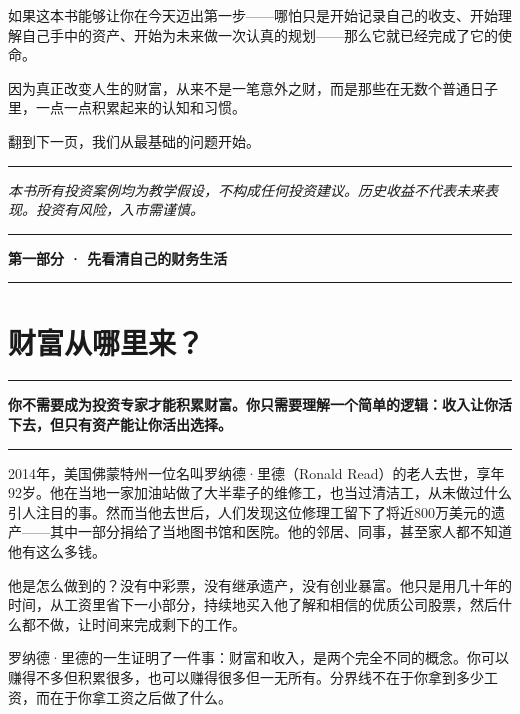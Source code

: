 \documentclass[a4paper,11pt,oneside,fontset=none,UTF8,zihao=-4]{ctexbook}
\newcommand{\partdivider}[1]{%
  \clearpage
  \thispagestyle{empty}%
  \vspace*{5.0cm}%
  \begin{center}%
    {\color{dh-blossom}\rule{0.35\textwidth}{1.5pt}\par}%
    \vspace{1.2cm}%
    {\Huge\bfseries\sffamily\color{dh-navy} #1\par}%
    \vspace{1.2cm}%
    {\color{dh-blossom}\rule{0.35\textwidth}{1.5pt}\par}%
  \end{center}%
  \vfill
  \clearpage
}
\begin{document}
如果这本书能够让你在今天迈出第一步------哪怕只是开始记录自己的收支、开始理解自己手中的资产、开始为未来做一次认真的规划------那么它就已经完成了它的使命。

因为真正改变人生的财富，从来不是一笔意外之财，而是那些在无数个普通日子里，一点一点积累起来的认知和习惯。

翻到下一页，我们从最基础的问题开始。

\begin{center}{\color{dh-bronze}\rule{0.2\textwidth}{0.5pt}}\end{center}

\emph{本书所有投资案例均为教学假设，不构成任何投资建议。历史收益不代表未来表现。投资有风险，入市需谨慎。}

\mainmatter

\partdivider{第一部分 · 先看清自己的财务生活}

\newpage

\chapter{财富从哪里来？}\label{ux8d22ux5bccux4eceux54eaux91ccux6765}

\begin{center}{\color{dh-bronze}\rule{0.2\textwidth}{0.5pt}}\end{center}

\begin{dhquote}
\textbf{你不需要成为投资专家才能积累财富。你只需要理解一个简单的逻辑：收入让你活下去，但只有资产能让你活出选择。}
\end{dhquote}

\begin{center}{\color{dh-bronze}\rule{0.2\textwidth}{0.5pt}}\end{center}

2014年，美国佛蒙特州一位名叫罗纳德·里德（Ronald
Read）的老人去世，享年92岁。他在当地一家加油站做了大半辈子的维修工，也当过清洁工，从未做过什么引人注目的事。然而当他去世后，人们发现这位修理工留下了将近800万美元的遗产------其中一部分捐给了当地图书馆和医院。他的邻居、同事，甚至家人都不知道他有这么多钱。

他是怎么做到的？没有中彩票，没有继承遗产，没有创业暴富。他只是用几十年的时间，从工资里省下一小部分，持续地买入他了解和相信的优质公司股票，然后什么都不做，让时间来完成剩下的工作。

罗纳德·里德的一生证明了一件事：财富和收入，是两个完全不同的概念。你可以赚得不多但积累很多，也可以赚得很多但一无所有。分界线不在于你拿到多少工资，而在于你拿工资之后做了什么。
\end{document}
